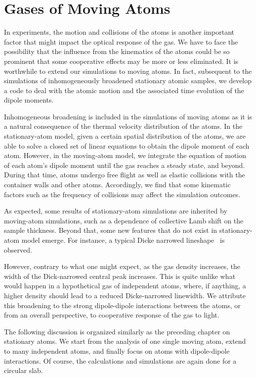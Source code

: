 \chapter{Gases of Moving Atoms}
In experiments, the motion and collisions of the atoms is another important factor that might impact the optical response of the gas. We have to face the possibility that the influence from the kinematics of the atoms could be so prominent that some cooperative effects may be more or less eliminated. It is worthwhile to extend our simulations to moving atoms. In fact, subsequent to the simulations of inhomogeneously broadened stationary atomic samples, we develop a code to deal with the atomic motion and the associated time evolution of the dipole moments. 

Inhomogeneous broadening is included in the simulations of moving atoms as it is a natural consequence of the thermal velocity distribution of the atoms. In the stationary-atom model, given a certain spatial distribution of the atoms, we are able to solve a closed set of linear equations to obtain the dipole moment of each atom.  However, in the moving-atom model, we integrate the equation of motion of each atom's dipole moment until  the gas reaches a steady state, and beyond. During that time, atoms undergo free flight as well as elastic collisions with the container walls and other atoms. Accordingly, we find that some kinematic factors such as the frequency of collisions may affect the simulation outcomes.

As expected, some results of stationary-atom simulations are inherited by moving-atom simulations, such as a dependence of collective Lamb shift on the sample thickness. Beyond that, some new features that do not exist in stationary-atom model  emerge. For instance, a typical Dicke narrowed lineshape~\cite{PhysRev.89.472} is observed.

However, contrary to what one might expect, as the gas density increases, the width of the Dick-narrowed central peak increases. This is quite unlike what would happen in a hypothetical gas of independent atoms, where, if anything, a higher density should lead to a reduced Dicke-narrowed linewidth. We attribute this broadening to the strong dipole-dipole interactions between the atoms, or from an overall perspective, to cooperative response of the gas to light. 

The following discussion is organized similarly as the preceding chapter on stationary atoms. We start from the analysis of one single moving atom, extend to many independent atoms, and finally focus on atoms with dipole-dipole interactions. Of course, the calculations and simulations are again done for a circular slab.

